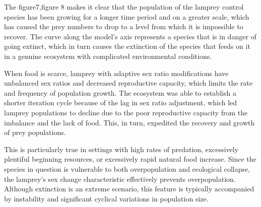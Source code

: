 \documentclass[12pt]{article}  %
\begin{document}
\par
The figure7,figure 8 makes it clear that the population of the lamprey control species has been growing for a longer time period and on a greater scale, which has caused the prey numbers to drop to a level from which it is impossible to recover. The curve along the model's axis represents a species that is in danger of going extinct, which in turn causes the extinction of the species that feeds on it in a genuine ecosystem with complicated environmental conditions.\par
When food is scarce, lamprey with adaptive sex ratio modifications have unbalanced sex ratios and decreased reproductive capacity, which limits the rate and frequency of population growth. The ecosystem was able to establish a shorter iteration cycle because of the lag in sex ratio adjustment, which led lamprey populations to decline due to the poor reproductive capacity from the imbalance and the lack of food. This, in turn, expedited the recovery and growth of prey populations.\par
This is particularly true in settings with high rates of predation, excessively plentiful beginning resources, or excessively rapid natural food increase. Since the species in question is vulnerable to both overpopulation and ecological collapse, the lamprey's sex change characteristic effectively prevents overpopulation. Although extinction is an extreme scenario, this feature is typically accompanied by instability and significant cyclical variations in population size.\par
\end{document}
